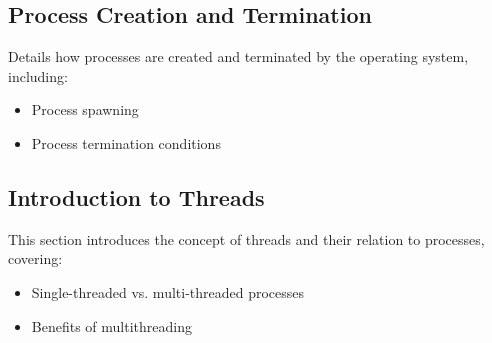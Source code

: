 \documentclass[12pt]{article}
\begin{document}
	\subsection{Process Creation and Termination}
	Details how processes are created and terminated by the operating system, including:
	\begin{itemize}
		\item Process spawning
		\item Process termination conditions
	\end{itemize}
	
	\subsection{Introduction to Threads}
	This section introduces the concept of threads and their relation to processes, covering:
	\begin{itemize}
		\item Single-threaded vs. multi-threaded processes
		\item Benefits of multithreading
	\end{itemize}
	
\end{document}
